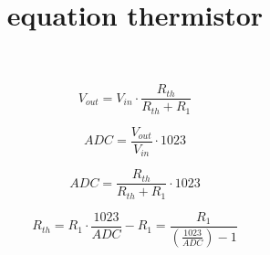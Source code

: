 \documentclass{beamer}
\title{ equation thermistor }
\begin{document}
\begin{equation}
V_{out} = V_{in} \cdot \frac{R_{th}}{R_{th} + R_1}
\end{equation}

\begin{equation}
ADC = \frac{V_{out}}{V_{in}} \cdot 1023
\end{equation}

\begin{equation}
ADC = \frac{R_{th}}{R_{th} + R_1} \cdot 1023
\end{equation}

\begin{equation}
R_{th} = R_1 \cdot \frac{1023}{ADC} - R_1 = \frac{R_1}{(\frac{1023}{ADC}) - 1}
\end{equation}

\end{document}
